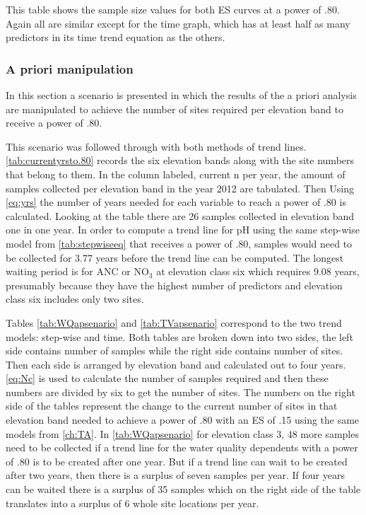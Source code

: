 

This table shows the sample size values for both ES curves at a power of .80.
Again all are similar except for the time graph, which has at least half as many predictors in its time trend equation as the others.

\subsubsection{A priori manipulation}

In this section a scenario is presented in which the results of the a priori analysis are manipulated to achieve the number of sites required per elevation band to receive a power of .80.


This scenario was followed through with both methods of trend lines.
\autoref{tab:currentyrsto.80} records the six elevation bands along with the site numbers that belong to them. 
 In the column labeled, current n per year, the amount of samples collected per elevation band in the year 2012 are tabulated.  
 Then Using \autoref{eq:yrs} the number of years needed for each variable to reach a power of .80 is calculated.
Looking at the table there are 26  samples collected in elevation band one in one year.  
In order to compute a trend line for pH using the same step-wise model from \autoref{tab:stepwiseeq} that receives a power of .80,  samples would need to be collected for 3.77 years before the trend line can be computed.   
The longest waiting period is for ANC or NO$_3$ at elevation class six which requires 9.08 years, presumably because they have the highest number of predictors and elevation class six includes only two sites. 




Tables \autoref{tab:WQapsenario} and \autoref{tab:TVapsenario} correspond to the two trend models: step-wise and time.
Both tables are broken down into two sides, the left side contains number of samples while the right side contains number of sites.
Then each side is arranged by elevation band and calculated out to four years.
\autoref{eq:Nc} is used to calculate the number of samples required and then these numbers are divided by six to get the number of sites.
The numbers on the right side of the tables represent the change to the current number of sites in that elevation band needed to achieve a power of .80 with an ES of .15 using the same models from \autoref{ch:TA}.
In \autoref{tab:WQapsenario} for elevation class 3, 48 more samples need to be collected if a trend line for the water quality dependents with a power of .80 is to be created after one year.  
But if a trend line can wait to be created after two years, then there is a surplus of seven samples per year.  
If four years can be waited there is a surplus of 35 samples which on the right side of the table translates into a surplus of 6 whole site locations per year.

